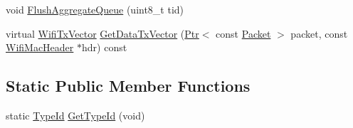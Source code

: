 \begin{DoxyCompactItemize}
\item 
void \hyperlink{classns3_1_1MacLow_ab143d3691846b2638a6f089c96169ee2}{Flush\+Aggregate\+Queue} (uint8\+\_\+t tid)
\item 
virtual \hyperlink{classns3_1_1WifiTxVector}{Wifi\+Tx\+Vector} \hyperlink{classns3_1_1MacLow_a04bad04eade9ff1de0940b01c5bcf514}{Get\+Data\+Tx\+Vector} (\hyperlink{classns3_1_1Ptr}{Ptr}$<$ const \hyperlink{classns3_1_1Packet}{Packet} $>$ packet, const \hyperlink{classns3_1_1WifiMacHeader}{Wifi\+Mac\+Header} $\ast$hdr) const 
\end{DoxyCompactItemize}
\subsection*{Static Public Member Functions}
\begin{DoxyCompactItemize}
\item 
static \hyperlink{classns3_1_1TypeId}{Type\+Id} \hyperlink{classns3_1_1MacLow_abacc68f094246209f7d4d69d1c75aa31}{Get\+Type\+Id} (void)
\end{DoxyCompactItemize}
